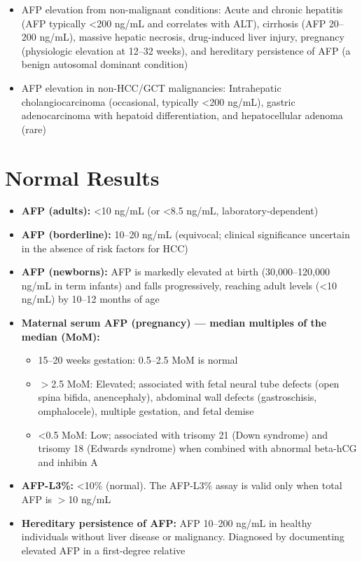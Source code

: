 \begin{itemize}
  \item AFP elevation from non-malignant conditions: Acute and chronic hepatitis (AFP typically <200 ng/mL and correlates with ALT), cirrhosis (AFP 20--200 ng/mL), massive hepatic necrosis, drug-induced liver injury, pregnancy (physiologic elevation at 12--32 weeks), and hereditary persistence of AFP (a benign autosomal dominant condition)
  \item AFP elevation in non-HCC/GCT malignancies: Intrahepatic cholangiocarcinoma (occasional, typically <200 ng/mL), gastric adenocarcinoma with hepatoid differentiation, and hepatocellular adenoma (rare)
\end{itemize}

\section*{Normal Results}
\begin{itemize}
  \item \textbf{AFP (adults):} <10 ng/mL (or <8.5 ng/mL, laboratory-dependent)
  \item \textbf{AFP (borderline):} 10--20 ng/mL (equivocal; clinical significance uncertain in the absence of risk factors for HCC)
  \item \textbf{AFP (newborns):} AFP is markedly elevated at birth (30,000--120,000 ng/mL in term infants) and falls progressively, reaching adult levels (<10 ng/mL) by 10--12 months of age
  \item \textbf{Maternal serum AFP (pregnancy) --- median multiples of the median (MoM):}
  \begin{itemize}
    \item 15--20 weeks gestation: 0.5--2.5 MoM is normal
    \item $>$2.5 MoM: Elevated; associated with fetal neural tube defects (open spina bifida, anencephaly), abdominal wall defects (gastroschisis, omphalocele), multiple gestation, and fetal demise
    \item <0.5 MoM: Low; associated with trisomy 21 (Down syndrome) and trisomy 18 (Edwards syndrome) when combined with abnormal beta-hCG and inhibin A
  \end{itemize}
  \item \textbf{AFP-L3\%:} <10\% (normal). The AFP-L3\% assay is valid only when total AFP is $>$10 ng/mL
  \item \textbf{Hereditary persistence of AFP:} AFP 10--200 ng/mL in healthy individuals without liver disease or malignancy. Diagnosed by documenting elevated AFP in a first-degree relative
\end{itemize}

